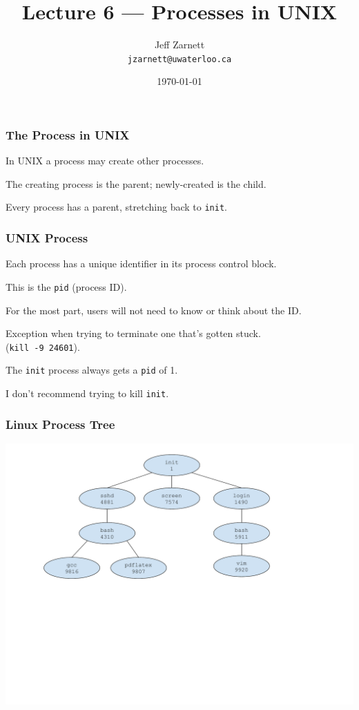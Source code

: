 

\title{Lecture 6 --- Processes in UNIX}

\author{Jeff Zarnett \\ \small \texttt{jzarnett@uwaterloo.ca}}
\date{\today}




\begin{frame}
  \titlepage

 \end{frame}

\begin{frame}
\frametitle{The Process in UNIX}

In UNIX a process may create other processes.

The creating process is the parent; newly-created is the child.

Every process has a parent, stretching back to \texttt{init}.

\end{frame}


\begin{frame}
\frametitle{UNIX Process}
Each process has a unique identifier in its process control block.

This is the \texttt{pid} (process ID). 

For the most part, users will not need to know or think about the ID.

Exception when trying to terminate one that's gotten stuck.\\
\quad (\texttt{kill -9 24601}). 

The \texttt{init} process always gets a \texttt{pid} of 1. 

I don't recommend trying to kill \texttt{init}.

\end{frame}

\begin{frame}
\frametitle{Linux Process Tree}

\begin{center}
\includegraphics[width=\textwidth]{images/linux-process-tree.pdf}
\end{center}

\end{frame}

